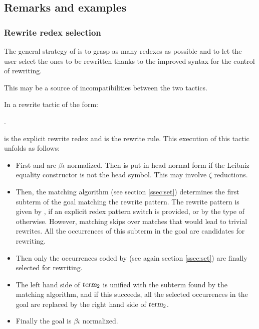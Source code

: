 \subsection{Remarks and examples}\label{ssec:rwex}

\subsubsection*{Rewrite redex selection}
The general strategy of \ssr{}
is to grasp as many redexes as possible and to let the user select the
ones to be rewritten thanks to the improved syntax for the control of
rewriting.

This may be a source of incompatibilities between the two 
tactics.

In a rewrite tactic of the form:

   \ssrC{[}\ssrC{]}.

 is the explicit rewrite redex and
 is the
rewrite rule. This execution of this tactic unfolds as follows:

\begin{itemize}
\item First  and  are $\beta\iota$ normalized. Then
   is put in head normal form if the Leibniz equality
  constructor  is not the head symbol. This may involve $\zeta$
  reductions.
\item Then, the matching algorithm (see section \ref{ssec:set})
  determines the first subterm of the goal matching the rewrite pattern.
  The rewrite pattern is
  given by , if an explicit redex pattern switch is provided, or by
  the type of  otherwise. However, matching skips over
  matches that would lead to trivial rewrites. All the
  occurrences of this subterm in the goal are candidates for rewriting.
\item Then only the occurrences coded by  (see again
  section \ref{ssec:set}) are finally selected for rewriting.
\item The left hand side of $\ssrN[2]{term}$ is unified with the subterm found
  by the matching algorithm, and if this succeeds, all the selected
  occurrences in the goal are replaced by the right hand side of
  $\ssrN[2]{term}$.
\item Finally the goal is $\beta\iota$ normalized.
\end{itemize}

